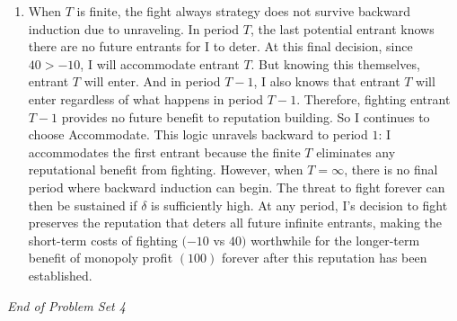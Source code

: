 \documentclass[11pt]{article}
\begin{document}
\begin{enumerate}[label=(\alph*)]
\begin{enumerate}[label=(\roman*)]
        \item[] When $T$ is finite, the fight always strategy does not survive backward induction due to unraveling. In period $T$, the last potential entrant knows there are no future entrants for I to deter. At this final decision, since $40>-10$, I will accommodate entrant $T$. But knowing this themselves, entrant $T$ will enter. And in period $T-1$, I also knows that entrant $T$ will enter regardless of what happens in period $T-1$. Therefore, fighting entrant $T-1$ provides no future benefit to reputation building. So I continues to choose Accommodate. This logic unravels backward to period $1$: I accommodates the first entrant because the finite $T$ eliminates any reputational benefit from fighting. However, when $T=\infty$, there is no final period where backward induction can begin. The threat to fight forever can then be sustained if $\delta$ is sufficiently high. At any period, I's decision to fight preserves the reputation that deters all future infinite entrants, making the short-term costs of fighting $(-10$ vs $40)$ worthwhile for the longer-term benefit of monopoly profit $(100)$ forever after this reputation has been established.
    \end{enumerate}
\end{enumerate}

\vspace{1cm}
\begin{center}
\textit{End of Problem Set 4}
\end{center}
\end{document}
